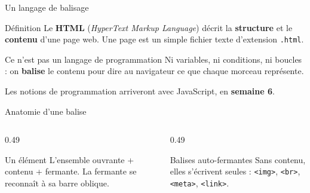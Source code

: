 \documentclass[aspectratio=169,11pt]{beamer}
\begin{document}
\begin{frame}{Un langage de balisage}
  \begin{block}{Définition}
    Le \textbf{HTML} (\textit{HyperText Markup Language}) décrit la \textbf{structure} et le \textbf{contenu} d'une page web. Une page est un simple fichier texte d'extension \texttt{.html}.
  \end{block}
  \vspace{0.3cm}
  \begin{alertblock}{Ce n'est pas un langage de programmation}
    Ni variables, ni conditions, ni boucles : on \textbf{balise} le contenu pour dire au navigateur ce que chaque morceau représente.
    \vspace{0.15cm}

    Les notions de programmation arriveront avec JavaScript, en \textbf{semaine 6}.
  \end{alertblock}
\end{frame}

\begin{frame}{Anatomie d'une balise}
  \vspace{0.4cm}
  \begin{center}
  \end{center}
  \vspace{0.3cm}
  \begin{columns}[T]
    \begin{column}{0.49\textwidth}
      \begin{block}{Un élément}
        L'ensemble ouvrante + contenu + fermante. La fermante se reconnaît à sa barre oblique.
      \end{block}
    \end{column}
    \begin{column}{0.49\textwidth}
      \begin{exampleblock}{Balises auto-fermantes}
        Sans contenu, elles s'écrivent seules : \texttt{<img>}, \texttt{<br>}, \texttt{<meta>}, \texttt{<link>}.
      \end{exampleblock}
    \end{column}
  \end{columns}
\end{frame}
\end{document}
